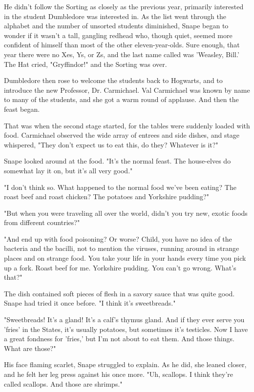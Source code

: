 \documentclass[a4paper,11pt]{article}
\begin{document}
He didn't follow the Sorting as closely as the previous year, primarily interested in the student Dumbledore was interested in. As the list went through the alphabet and the number of unsorted students diminished, Snape began to wonder if it wasn't a tall, gangling redhead who, though quiet, seemed more confident of himself than most of the other eleven-year-olds. Sure enough, that year there were no Xes, Ys, or Zs, and the last name called was 'Weasley, Bill.' The Hat cried, "Gryffindor!" and the Sorting was over.

Dumbledore then rose to welcome the students back to Hogwarts, and to introduce the new Professor, Dr. Carmichael. Val Carmichael was known by name to many of the students, and she got a warm round of applause. And then the feast began.

That was when the second stage started, for the tables were suddenly loaded with food. Carmichael observed the wide array of entrees and side dishes, and stage whispered, "They don't expect us to eat this, do they? Whatever is it?"

Snape looked around at the food. "It's the normal feast. The house-elves do somewhat lay it on, but it's all very good."

"I don't think so. What happened to the normal food we've been eating? The roast beef and roast chicken? The potatoes and Yorkshire pudding?"

"But when you were traveling all over the world, didn't you try new, exotic foods from different countries?"

"And end up with food poisoning? Or worse? Child, you have no idea of the bacteria and the bacilli, not to mention the viruses, running around in strange places and on strange food. You take your life in your hands every time you pick up a fork. Roast beef for me. Yorkshire pudding. You can't go wrong. What's that?"

The dish contained soft pieces of flesh in a savory sauce that was quite good. Snape had tried it once before. "I think it's sweetbreads."

"Sweetbreads! It's a gland! It's a calf's thymus gland. And if they ever serve you 'fries' in the States, it's usually potatoes, but sometimes it's testicles. Now I have a great fondness for 'fries,' but I'm not about to eat them. And those things. What are those?"

His face flaming scarlet, Snape struggled to explain. As he did, she leaned closer, and he felt her leg press against his once more. "Uh, scallops. I think they're called scallops. And those are shrimps."
\end{document}
